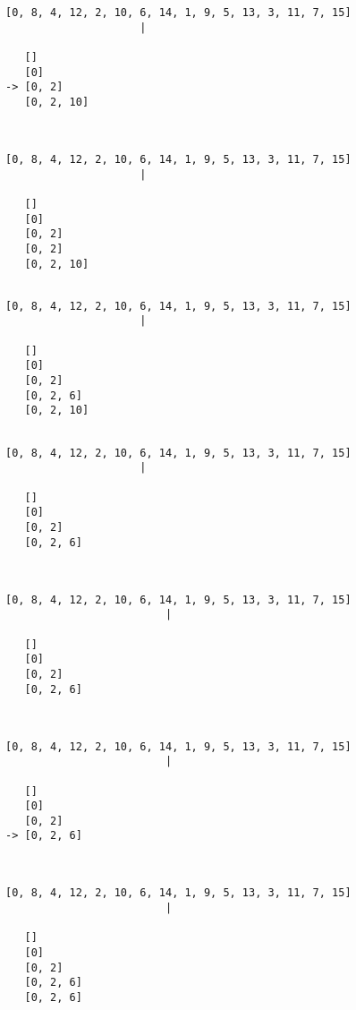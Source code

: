 { \begin{verbatim}
[0, 8, 4, 12, 2, 10, 6, 14, 1, 9, 5, 13, 3, 11, 7, 15]
                     |

   []
   [0]
-> [0, 2]
   [0, 2, 10]



\end{verbatim} }

{ \begin{verbatim}
[0, 8, 4, 12, 2, 10, 6, 14, 1, 9, 5, 13, 3, 11, 7, 15]
                     |

   []
   [0]
   [0, 2]
   [0, 2]
   [0, 2, 10]


\end{verbatim} }

{ \begin{verbatim}
[0, 8, 4, 12, 2, 10, 6, 14, 1, 9, 5, 13, 3, 11, 7, 15]
                     |

   []
   [0]
   [0, 2]
   [0, 2, 6]
   [0, 2, 10]


\end{verbatim} }

{ \begin{verbatim}
[0, 8, 4, 12, 2, 10, 6, 14, 1, 9, 5, 13, 3, 11, 7, 15]
                     |

   []
   [0]
   [0, 2]
   [0, 2, 6]



\end{verbatim} }

{ \begin{verbatim}
[0, 8, 4, 12, 2, 10, 6, 14, 1, 9, 5, 13, 3, 11, 7, 15]
                         |

   []
   [0]
   [0, 2]
   [0, 2, 6]



\end{verbatim} }

{ \begin{verbatim}
[0, 8, 4, 12, 2, 10, 6, 14, 1, 9, 5, 13, 3, 11, 7, 15]
                         |

   []
   [0]
   [0, 2]
-> [0, 2, 6]



\end{verbatim} }

{ \begin{verbatim}
[0, 8, 4, 12, 2, 10, 6, 14, 1, 9, 5, 13, 3, 11, 7, 15]
                         |

   []
   [0]
   [0, 2]
   [0, 2, 6]
   [0, 2, 6]


\end{verbatim} }

